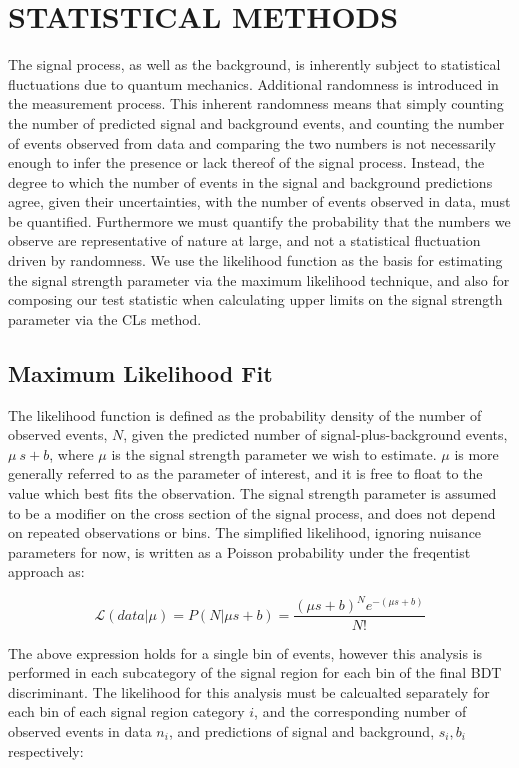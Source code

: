 %
%

\chapter{STATISTICAL METHODS}
\label{chap:stats}
The \tth signal process, as well as the background, is inherently subject to statistical fluctuations due to quantum mechanics.
Additional randomness is introduced in the measurement process. This inherent randomness means that simply counting the number of predicted
signal and background events, and counting the number of events observed from data and comparing the two numbers is not necessarily enough to infer the presence or
lack thereof of the \tth signal process. Instead, the degree to which the
number of events in the signal and background predictions agree, given their uncertainties, with the number of events observed in data, must be quantified.
Furthermore we must quantify the probability that the numbers we observe are representative of nature at large, and not a statistical fluctuation driven by randomness. 
We use the likelihood function as the basis for estimating the signal strength parameter via the maximum likelihood technique, and also for composing our test statistic when
calculating upper limits  on the signal strength parameter via the CLs method. 


\section{Maximum Likelihood Fit}
\label{sec:fit}
The likelihood function is defined as the probability density of the number of observed events, $N$, given the predicted number of signal-plus-background events, $\mu~s + b$,
where $\mu$ is the signal strength parameter we wish to estimate. $\mu$ is more generally referred to as the parameter of interest, and it is free to float to the value
which best fits the observation. The signal strength parameter is assumed to be a modifier on the cross section of the \tth signal process, and does not depend on repeated
observations or bins. The simplified likelihood, ignoring nuisance parameters for now, is written as a Poisson probability under the freqentist approach as:

\begin{equation}
\label{eqn:likelihood1}
\mathcal{L}(data|\mu) = P(N|\mu s+b) = \frac{(\mu s+b)^{N}e^{-(\mu s+b)}}{N!}
\end{equation}

\noindent The above expression holds for a single bin of events, however this analysis is performed in each subcategory of the signal
region for each bin of the final BDT discriminant. The likelihood for this analysis must be calcualted separately for each bin of each signal region category $i$, and
the corresponding number of observed events in data $n_{i}$, and predictions of signal and background, $s_{i}, b_{i}$ respectively:

